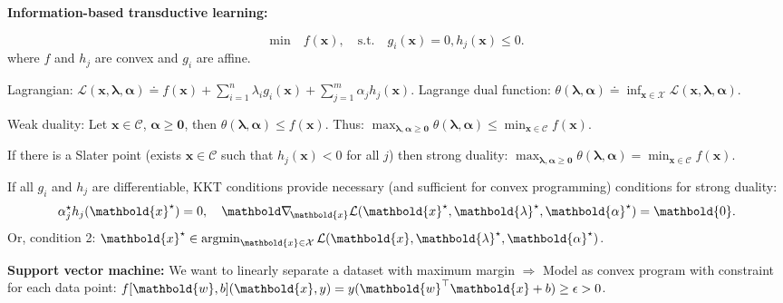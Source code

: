 \documentclass[9pt]{extarticle}
\newenvironment{topic}[1]
{\textbf{\sffamily \colorbox{black}{\rlap{\textbf{\textcolor{white}{#1}}}\hspace{\linewidth}\hspace{-2\fboxsep}}}}
{}
\newenvironment{subtopic}[1]
{\textbf{\sffamily #1:}}
{}
\renewcommand{\vec}[1]{\ensuremath{\mathbold{#1}}}
\begin{document}
\begin{multicols*}{3}
\begin{topic}{Uncertainty quantification}
\begin{subtopic}{Information-based transductive learning}
        \end{subtopic}

    \end{topic}

    \begin{topic}{Convex optimization and SVMs}
        \[
            \text{min} \quad f(\vec{x}), \quad \text{s.t.} \quad g_i(\vec{x}) = 0, h_j(\vec{x}) \leq 0.
        \]
        where $f$ and $h_j$ are convex and $g_i$ are affine.

        Lagrangian: $\mathcal{L}(\vec{x}, \vec{\lambda}, \vec{\alpha}) \doteq f(\vec{x}) + \sum_{i=1}^{n}
            \lambda_i g_i(\vec{x}) + \sum_{j=1}^{m} \alpha_j h_j(\vec{x})$. Lagrange dual function:
        $\theta(\vec{\lambda}, \vec{\alpha}) \doteq \inf_{\vec{x} \in \mathcal{X}} \mathcal{L}(\vec{x},
            \vec{\lambda}, \vec{\alpha})$.

        Weak duality: Let $\vec{x} \in \mathcal{C}$, $\vec{\alpha} \geq \vec{0}$, then
        $\theta(\vec{\lambda}, \vec{\alpha}) \leq f(\vec{x})$. Thus: $\max_{\vec{\lambda}, \vec{\alpha}
                \geq \vec{0}} \theta(\vec{\lambda}, \vec{\alpha}) \leq \min_{\vec{x} \in \mathcal{C}} f(\vec{x})$.

        If there is a Slater point (exists $\vec{x} \in \mathcal{C}$ such that $h_j(\vec{x}) < 0$ for all
        $j$) then strong duality: $\max_{\vec{\lambda}, \vec{\alpha} \geq \vec{0}} \theta(\vec{\lambda},
            \vec{\alpha}) = \min_{\vec{x} \in \mathcal{C}} f(\vec{x})$.

        If all $g_i$ and $h_j$ are differentiable, KKT conditions provide necessary (and sufficient for
        convex programming) conditions for strong duality: \[
            \alpha_j^\star h_j(\vec{x}^\star) = 0, \quad \grad{\mathcal{L}(\vec{x}^\star, \vec{\lambda}^\star, \vec{\alpha}^\star)}{\vec{x}} = \vec{0}.
        \]
        Or, condition 2: $\vec{x}^\star \in \argmin_{\vec{x} \in \mathcal{X}} \mathcal{L}(\vec{x},
            \vec{\lambda}^\star, \vec{\alpha}^\star)$.

        \begin{subtopic}{Support vector machine}
            We want to linearly separate a dataset with maximum margin $\Rightarrow$ Model as convex program
            with constraint for each data point: $f[\vec{w},b](\vec{x},y) = y (\transpose{\vec{w}}\vec{x} + b) \geq \epsilon > 0$.


\end{subtopic}
\end{topic}
\end{multicols*}
\end{document}
